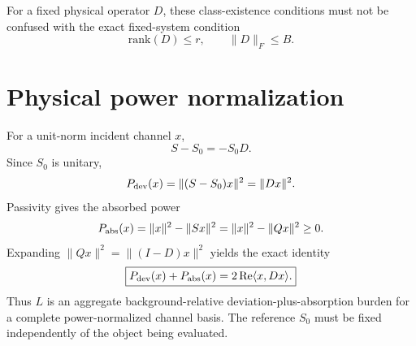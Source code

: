 \documentclass[aps,pra,onecolumn,superscriptaddress,nofootinbib]{revtex4-2}
\begin{document}
For a fixed physical operator $D$, these class-existence conditions must not be confused with the exact fixed-system condition
\begin{equation}
\mathrm{rank}(D)\le r,\qquad \|D\|_F\le B.
\end{equation}

\section{Physical power normalization}
For a unit-norm incident channel $x$,
\begin{equation}
S-S_0=-S_0D.
\end{equation}
Since $S_0$ is unitary,
\begin{equation}
P_{\rm dev}(x)=\|(S-S_0)x\|^2=\|Dx\|^2.
\end{equation}
Passivity gives the absorbed power
\begin{equation}
P_{\rm abs}(x)=\|x\|^2-\|Sx\|^2=\|x\|^2-\|Qx\|^2\ge0.
\end{equation}
Expanding $\|Qx\|^2=\|(I-D)x\|^2$ yields the exact identity
\begin{equation}
\boxed{P_{\rm dev}(x)+P_{\rm abs}(x)=2\,\mathrm{Re}\langle x,Dx\rangle.}
\end{equation}
Thus $L$ is an aggregate background-relative deviation-plus-absorption burden for a complete power-normalized channel basis. The reference $S_0$ must be fixed independently of the object being evaluated.
\end{document}
